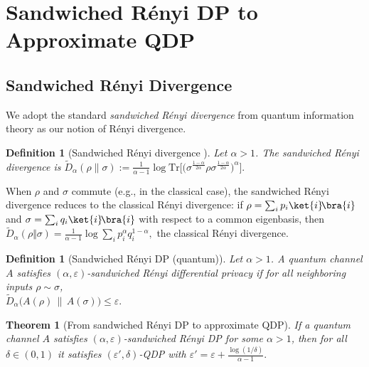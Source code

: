 \documentclass[11pt]{article}
\def\Tr{\mathrm{Tr}}
\theoremstyle{plain}
\newtheorem{theorem}[theo]{Theorem}
\newtheorem{definition}[theo]{Definition}
\theoremstyle{remark}
\begin{document}






\appendix

\section{Sandwiched R\'enyi DP to Approximate QDP}

\subsection{Sandwiched R\'enyi Divergence}
\label{subsec:sandwiched-renyi}

We adopt the standard \emph{sandwiched R\'enyi divergence} from quantum
information theory as our notion of R\'enyi divergence.

\begin{definition}[Sandwiched R\'enyi divergence \cite{muller2013quantum, wilde2014strong}]
\label{def:sandwiched-renyi}
Let $\alpha>1$.  The sandwiched R\'enyi divergence is
$
    \widetilde D_\alpha(\rho\|\sigma)
    :=
    \frac{1}{\alpha-1}
    \log
    \Tr\Big[
        \big(
            \sigma^{\frac{1-\alpha}{2\alpha}}
            \rho
            \sigma^{\frac{1-\alpha}{2\alpha}}
        \big)^\alpha
    \Big].
$
\end{definition}

When $\rho$ and $\sigma$ commute (e.g., in the classical case), the
sandwiched R\'enyi divergence reduces to the classical R\'enyi divergence:
if $\rho=\sum_i p_i\ket{i}\!\bra{i}$ and
$\sigma=\sum_i q_i\ket{i}\!\bra{i}$ with respect to a common eigenbasis,
then
$
    \widetilde D_\alpha(\rho\Vert\sigma)
    =
    \frac{1}{\alpha-1}
    \log \sum_i p_i^\alpha q_i^{1-\alpha}, $
the classical R\'enyi divergence.


\begin{definition}[Sandwiched R\'enyi DP (quantum)]
Let $\alpha>1$. A quantum channel $A$ satisfies $(\alpha,\varepsilon)$-\emph{sandwiched R\'enyi
differential privacy} if for all neighboring inputs $\rho\sim\sigma$, \\ $
\widetilde D_\alpha\!\big(A(\rho)\,\|\,A(\sigma)\big)\le \varepsilon.
$
\end{definition}


\begin{theorem}[From sandwiched R\'enyi DP to approximate QDP]
\label{thm:srdp-to-qdp}
If a quantum channel $A$ satisfies $(\alpha,\varepsilon)$-sandwiched R\'enyi DP for some
$\alpha>1$, then for all $\delta\in(0,1)$ it satisfies $(\varepsilon',\delta)$-QDP with
$
\varepsilon'
=
\varepsilon+\frac{\log(1/\delta)}{\alpha-1}.
$
\end{theorem}
\end{document}
